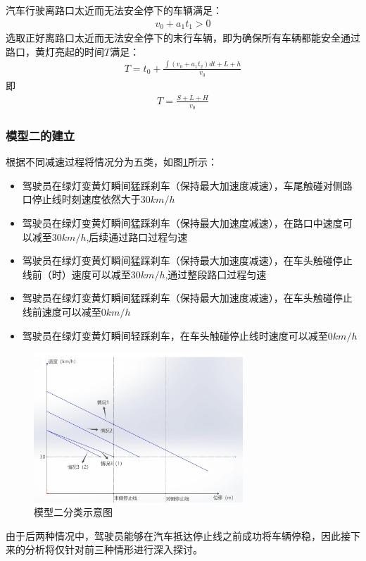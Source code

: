 \documentclass[withoutpreface,bwprint]{cumcmthesis}
\begin{document}
汽车行驶离路口太近而无法安全停下的车辆满足：
\begin{align*}
v_0 + a_{1}t_1 > 0
\end{align*}
选取正好离路口太近而无法安全停下的末行车辆，即为确保所有车辆都能安全通过路口，黄灯亮起的时间$T$满足：
\begin{align*}
	T = t_0 + \frac{\int (v_0 + a_{1}t_2) dt + L + h }{v_0}
\end{align*}
即
\begin{align*}
	T = \frac{S + L + H}{v_0}
\end{align*}


\subsubsection{模型二的建立}
根据不同减速过程将情况分为五类，如图\ref{fig:proc}所示：
\begin{itemize}
	\item 驾驶员在绿灯变黄灯瞬间猛踩刹车（保持最大加速度减速），车尾触碰对侧路口停止线时刻速度依然大于30$km/h$
	\item 驾驶员在绿灯变黄灯瞬间猛踩刹车（保持最大加速度减速），在路口中速度可以减至30$km/h$,后续通过路口过程匀速
	\item 驾驶员在绿灯变黄灯瞬间猛踩刹车（保持最大加速度减速），在车头触碰停止线前（时）速度可以减至30$km/h$,通过整段路口过程匀速
	\item  驾驶员在绿灯变黄灯瞬间猛踩刹车（保持最大加速度减速），在车头触碰停止线前速度可以减至0$km/h$
	\item  驾驶员在绿灯变黄灯瞬间轻踩刹车，在车头触碰停止线时速度可以减至0$km/h$
\end{itemize}
\begin{figure}[htbp!]
	\centering
	\includegraphics[width=0.7\textwidth]{pics/process}
	\caption{模型二分类示意图}
	\label{fig:proc}
\end{figure}
由于后两种情况中，驾驶员能够在汽车抵达停止线之前成功将车辆停稳，因此接下来的分析将仅针对前三种情形进行深入探讨。
\end{document}
